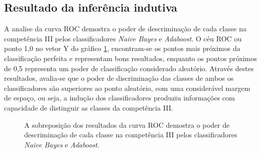 \subsection{Resultado da inferência indutiva}

A analise da curva ROC demostra o poder de descriminação de cada classe na 
competência III pelos classificadores \textit{Naive Bayes} e \textit{Adaboost}. 
O céu ROC ou ponto 1,0 no vetor Y do gráfico \ref{graphic:roc}, encontram-se os 
pontos mais próximos da classificação perfeita e representam bons resultados, 
enquanto os pontos próximos de 0,5 representa um poder de classificação 
considerado aleatório. Através destes resultados, avalia-se que o poder de 
discriminação das classes de ambos os classificadores são superiores ao ponto 
aleatório, com uma considerável margem de espaço, ou seja, a indução dos 
classificadores produziu informações com capacidade de distinguir as classes da 
competência III.

\begin{figure}[H]
    \begin{center}
    \end{center}
    \caption{A sobreposição dos resultados da curva ROC demostra o poder de 
    descriminação de cada classe na competência III pelos classificadores 
    \textit{Naive Bayes} e \textit{Adaboost}.}
    \label{graphic:roc}
\end{figure}

